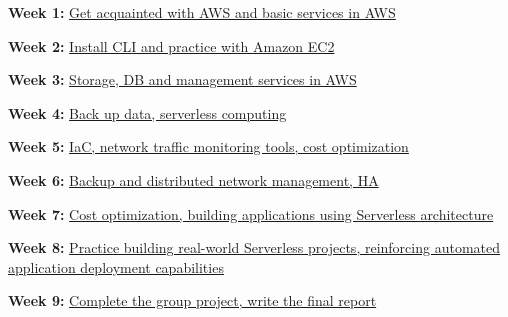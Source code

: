 \textbf{Week 1:} \href{1.1-week1/}{Get acquainted with AWS and basic
services in AWS}

\textbf{Week 2:} \href{1.2-week2/}{Install CLI and practice with Amazon
EC2}

\textbf{Week 3:} \href{1.3-week3/}{Storage, DB and management services
in AWS}

\textbf{Week 4:} \href{1.4-week4/}{Back up data, serverless computing}

\textbf{Week 5:} \href{1.5-week5/}{IaC, network traffic monitoring
tools, cost optimization}

\textbf{Week 6:} \href{1.6-week6/}{Backup and distributed network
management, HA}

\textbf{Week 7:} \href{1.7-week7/}{Cost optimization, building
applications using Serverless architecture}

\textbf{Week 8:} \href{1.8-week8/}{Practice building real-world
Serverless projects, reinforcing automated application deployment
capabilities}

\textbf{Week 9:} \href{1.9-week9/}{Complete the group project, write the
final report}
